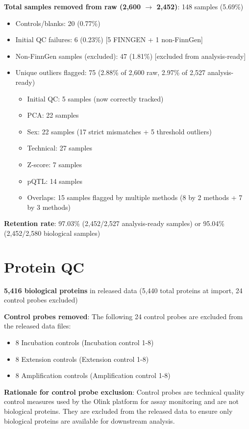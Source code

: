 \documentclass[11pt,a4paper]{article}
\begin{document}
\textbf{Total samples removed from raw (2,600 $\to$ 2,452)}: 148 samples (5.69\%)
\begin{itemize}
\item Controls/blanks: 20 (0.77\%)
\item Initial QC failures: 6 (0.23\%) [5 FINNGEN + 1 non-FinnGen]
\item Non-FinnGen samples (excluded): 47 (1.81\%) [excluded from analysis-ready]
\item Unique outliers flagged: 75 (2.88\% of 2,600 raw, 2.97\% of 2,527 analysis-ready)
  \begin{itemize}
    \item Initial QC: 5 samples (now correctly tracked)
    \item PCA: 22 samples
    \item Sex: 22 samples (17 strict mismatches + 5 threshold outliers)
    \item Technical: 27 samples
    \item Z-score: 7 samples
    \item pQTL: 14 samples
    \item Overlaps: 15 samples flagged by multiple methods (8 by 2 methods + 7 by 3 methods)
  \end{itemize}
\end{itemize}

\textbf{Retention rate}: 97.03\% (2,452/2,527 analysis-ready samples) or 95.04\% (2,452/2,580 biological samples)

\section{Protein QC}

\textbf{5,416 biological proteins} in released data (5,440 total proteins at import, 24 control probes excluded)

\textbf{Control probes removed}: The following 24 control probes are excluded from the released data files:
\begin{itemize}
\item 8 Incubation controls (Incubation control 1-8)
\item 8 Extension controls (Extension control 1-8)
\item 8 Amplification controls (Amplification control 1-8)
\end{itemize}

\textbf{Rationale for control probe exclusion}: Control probes are technical quality control measures used by the Olink platform for assay monitoring and are not biological proteins. They are excluded from the released data to ensure only biological proteins are available for downstream analysis.
\end{document}
